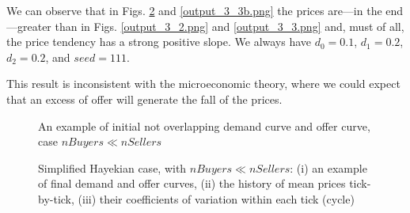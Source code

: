 \documentclass[10pt]{report}
\begin{document}
\begin{appendices}
We can observe that in Figs. \ref{output_3_2b.png} and \ref{output_3_3b.png} the prices are---in the end---greater than in Figs. \ref{output_3_2.png} and \ref{output_3_3.png} and, must of all, the price tendency has a strong positive slope. We always have $d_0=0.1$, $d_1=0.2$,  $d_2=0.2$, and $seed=111$.

This result is inconsistent with the microeconomic theory, where we could expect that an excess of offer will generate the fall of the prices.


\begin{figure}[H]
\begin{center}
\caption{An example of initial not overlapping demand curve and offer curve, case $nBuyers \ll nSellers$}
\label{output_3_1b.png}
\end{center}
\end{figure}

\begin{figure}[H]
\begin{center}
\caption{Simplified Hayekian case, with $nBuyers \ll nSellers$: (i) an example of final demand and offer curves, (ii) the history of mean prices tick-by-tick, (iii) their coefficients of variation within each tick (cycle)}
\label{output_3_2b.png}
\end{center}
\end{figure}


\end{appendices}
\end{document}
